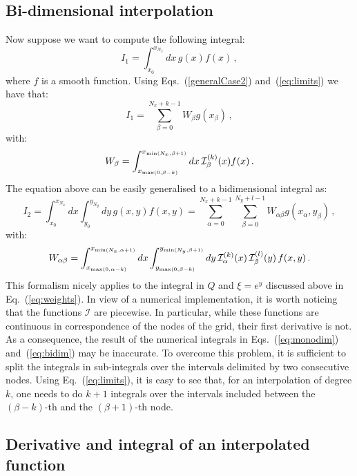\documentclass[10pt,a4paper]{article}
\begin{document}
\subsection{Bi-dimensional interpolation}

Now suppose we want to compute the following integral:
\begin{equation}
I_1 = \int_{x_0}^{x_{N_x}}dx\,g(x)f(x)\,,
\end{equation}
where $f$ is a smooth function. Using Eqs.~(\ref{generalCase2})
and~(\ref{eq:limits}) we have that:
\begin{equation}
  I_1 = \sum_{\beta=0}^{N_x+k-1} W_\beta g(x_{\beta})\,,
\end{equation}
with:
\begin{equation}\label{eq:monodim}
W_\beta = \int_{x_{{\rm max}(0,\beta-k)}}^{x_{{\rm min}(N_x,\beta+1)}}dx \,\mathcal{I}_\beta^{(k)}(x)f(x)\,.
\end{equation}
The equation above can be easily generalised to a bidimensional
integral as:
\begin{equation}
I_2 = \int_{x_0}^{x_{N_x}}dx \int_{y_0}^{y_{N_y}}dy\,g(x,y)f(x,y) = \sum_{\alpha=0}^{N_x+k-1} \sum_{\beta=0}^{N_y+l-1} W_{\alpha\beta} g(x_{\alpha},y_{\beta})\,,
\end{equation}
with:
\begin{equation}\label{eq:bidim}
W_{\alpha\beta} = \int_{x_{{\rm max}(0,\alpha-k)}}^{x_{{\rm
      min}(N_x,\alpha+1)}}dx \int_{y_{{\rm max}(0,\beta-k)}}^{y_{{\rm
      min}(N_y,\beta+1)}}dy \,\mathcal{I}_\alpha^{(k)}(x)\,\mathcal{I}_\beta^{(l)}(y)\,f(x,y)\,.
\end{equation}
This formalism nicely applies to the integral in $Q$ and $\xi=e^{y}$
discussed above in Eq.~(\ref{eq:weights}). In view of a numerical
implementation, it is worth noticing that the functions $\mathcal{I}$
are piecewise. In particular, while these functions are continuous in
correspondence of the nodes of the grid, their first derivative is
not. As a consequence, the result of the numerical integrals in
Eqs.~(\ref{eq:monodim}) and~(\ref{eq:bidim}) may be inaccurate. To
overcome this problem, it is sufficient to split the integrals in
sub-integrals over the intervals delimited by two consecutive
nodes. Using Eq.~(\ref{eq:limits}), it is easy to see that, for an
interpolation of degree $k$, one needs to do $k+1$ integrals over the
intervals included between the $(\beta-k)$-th and the $(\beta+1)$-th
node.

\subsection{Derivative and integral of an interpolated function}
\end{document}

